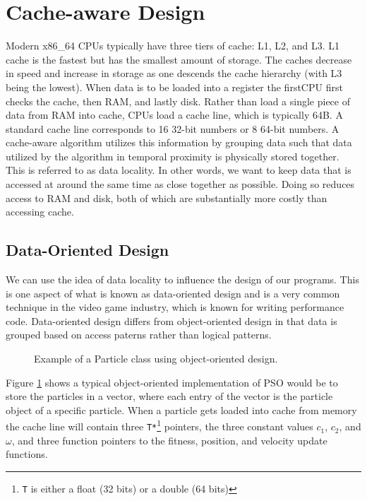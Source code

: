 \section{Cache-aware Design}\label{sec:cache}
Modern x86\_64 CPUs typically have three tiers of cache: L1, L2, and
L3. L1 cache is the fastest but has the smallest amount of storage. The caches
decrease in speed and increase in storage as one descends the cache
hierarchy (with L3 being the lowest). When data is to be loaded into a register
the firstCPU first checks the
cache, then RAM, and lastly disk. Rather than load a single piece of data from
RAM into cache, CPUs load a cache line, which is typically 64B. A standard cache
line corresponds to 16 32-bit numbers or 8 64-bit numbers. A cache-aware
algorithm utilizes this information by grouping data such that data utilized by
the algorithm in temporal proximity is physically stored together. This
is referred to as data locality. In other words, we want to keep data that is
accessed at around the same time as close together as possible. Doing so reduces
access to RAM and disk, both of which are substantially more
costly than accessing cache.

\subsection{Data-Oriented Design}
We can use the idea of data locality to
influence the design of our programs. This is one aspect of what is known as
data-oriented design and
is a very common technique in the video game industry, which is known for
writing performance code.
Data-oriented design
differs from object-oriented design in that data is grouped based on access
paterns rather than logical patterns.

\begin{figure}
  
  \caption{Example of a Particle class using object-oriented
    design.}\label{fig:particle}
\end{figure}

Figure \ref{fig:particle} shows a typical object-oriented implementation of PSO would be to store the
particles in a vector, where each entry of the vector is the particle object of
a specific particle. When a particle gets loaded into cache from memory the
cache line will contain three \texttt{T*}\footnote{\texttt{T} is either a float
  (32 bits) or a double (64 bits)} pointers, the three constant values
$c_1$, $c_2$, and $\omega$, and three function pointers to the fitness,
position, and velocity update functions.

